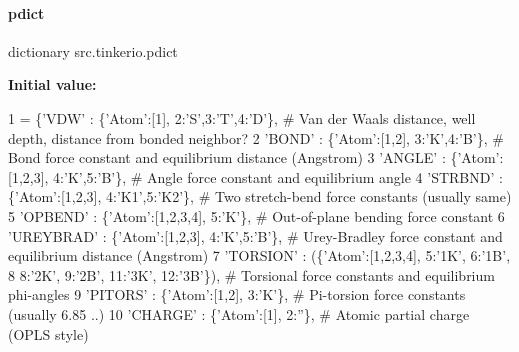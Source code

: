 \paragraph{\texorpdfstring{pdict}{pdict}}
{\footnotesize\ttfamily dictionary src.\+tinkerio.\+pdict}

{\bfseries Initial value\+:}
\begin{DoxyCode}
1 =  \{\textcolor{stringliteral}{'VDW'}          : \{\textcolor{stringliteral}{'Atom'}:[1], 2:\textcolor{stringliteral}{'S'},3:\textcolor{stringliteral}{'T'},4:\textcolor{stringliteral}{'D'}\}, \textcolor{comment}{# Van der Waals distance, well depth, distance from
       bonded neighbor?}
2          \textcolor{stringliteral}{'BOND'}         : \{\textcolor{stringliteral}{'Atom'}:[1,2], 3:\textcolor{stringliteral}{'K'},4:\textcolor{stringliteral}{'B'}\},     \textcolor{comment}{# Bond force constant and equilibrium distance
       (Angstrom)}
3          \textcolor{stringliteral}{'ANGLE'}        : \{\textcolor{stringliteral}{'Atom'}:[1,2,3], 4:\textcolor{stringliteral}{'K'},5:\textcolor{stringliteral}{'B'}\},   \textcolor{comment}{# Angle force constant and equilibrium angle}
4          \textcolor{stringliteral}{'STRBND'}       : \{\textcolor{stringliteral}{'Atom'}:[1,2,3], 4:\textcolor{stringliteral}{'K1'},5:\textcolor{stringliteral}{'K2'}\}, \textcolor{comment}{# Two stretch-bend force constants (usually
       same)}
5          \textcolor{stringliteral}{'OPBEND'}       : \{\textcolor{stringliteral}{'Atom'}:[1,2,3,4], 5:\textcolor{stringliteral}{'K'}\},       \textcolor{comment}{# Out-of-plane bending force constant}
6          \textcolor{stringliteral}{'UREYBRAD'}     : \{\textcolor{stringliteral}{'Atom'}:[1,2,3], 4:\textcolor{stringliteral}{'K'},5:\textcolor{stringliteral}{'B'}\},   \textcolor{comment}{# Urey-Bradley force constant and equilibrium
       distance (Angstrom)}
7          \textcolor{stringliteral}{'TORSION'}      : (\{\textcolor{stringliteral}{'Atom'}:[1,2,3,4], 5:\textcolor{stringliteral}{'1K'}, 6:\textcolor{stringliteral}{'1B'}, 
8                             8:\textcolor{stringliteral}{'2K'}, 9:\textcolor{stringliteral}{'2B'}, 11:\textcolor{stringliteral}{'3K'}, 12:\textcolor{stringliteral}{'3B'}\}), \textcolor{comment}{# Torsional force constants and equilibrium
       phi-angles}
9          \textcolor{stringliteral}{'PITORS'}       : \{\textcolor{stringliteral}{'Atom'}:[1,2], 3:\textcolor{stringliteral}{'K'}\},           \textcolor{comment}{# Pi-torsion force constants (usually 6.85 ..)}
10          \textcolor{stringliteral}{'CHARGE'}       : \{\textcolor{stringliteral}{'Atom'}:[1], 2:\textcolor{stringliteral}{''}\},              \textcolor{comment}{# Atomic partial charge (OPLS style)}

\end{DoxyCode}
